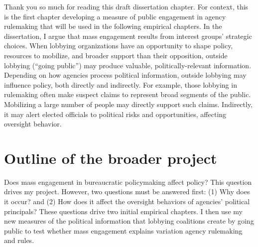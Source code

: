 
Thank you so much for reading this draft dissertation chapter. For context, this is the first chapter developing a measure of public engagement in agency rulemaking that will be used in the following empirical chapters. In the dissertation, I argue that mass engagement results from interest groups' strategic choices. When lobbying organizations have an opportunity to shape policy, resources to mobilize, and broader support than their opposition, outside lobbying (``going public'') may produce valuable, politically-relevant information. Depending on how agencies process political information, outside lobbying may %
influence policy, both directly and indirectly.
For example, those lobbying in rulemaking often make suspect claims to represent broad segments of the public. Mobilizing a large number of people may directly support such claims.
Indirectly, it may alert elected officials to political risks and opportunities, affecting oversight behavior. %
\section*{Outline of the broader project}

Does mass engagement in bureaucratic policymaking affect policy? This question drives my project. However, two questions must be answered first: (1) Why does it occur? and (2) How does it affect the oversight behaviors of agencies' political principals? These questions drive two initial empirical chapters.
I then use my new measures of the political information that lobbying coalitions create by going public to test whether mass engagement explains variation agency rulemaking and rules.%

